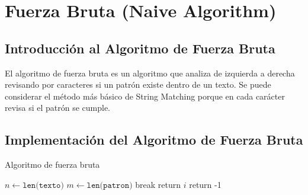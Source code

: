 \section*{Fuerza Bruta (Naive Algorithm)}

\subsection*{Introducción al Algoritmo de Fuerza Bruta}

\quad El algoritmo de fuerza bruta es un algoritmo que analiza de izquierda a derecha revisando por caracteres si un patrón existe dentro de un texto. Se puede considerar el método más básico de String Matching porque en cada carácter revisa si el patrón se cumple.

\subsection*{Implementación del Algoritmo de Fuerza Bruta}

\begin{algorithm} [H]
    \caption{Algoritmo de fuerza bruta}\label{alg:FB}
    \begin{algorithmic} [1]
            \State $n \gets \texttt{len(texto)}$
            \State $m \gets \texttt{len(patron)}$
             
                 
                     
                        \State break
                    \EndIf
                \EndFor
                 
                    \State return $i$
                \EndIf
            \EndFor
            \State return -1 
        \EndProcedure
    \end{algorithmic}
\end{algorithm}


